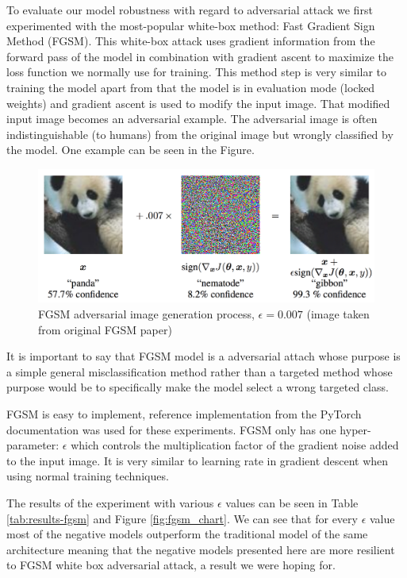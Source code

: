 \documentclass[b5paper]{book}
\let\cite\parencite
\begin{document}
To evaluate our model robustness with regard to adversarial attack we first experimented with the most-popular white-box method: Fast Gradient Sign Method (FGSM). \cite{goodfellowexplaining} This white-box attack uses gradient information from the forward pass of the model in combination with gradient ascent to maximize the loss function we normally use for training. This method step is very similar to training the model apart from that the model is in evaluation mode (locked weights) and gradient ascent is used to modify the input image. That modified input image becomes an adversarial example. The adversarial image is often indistinguishable (to humans) from the original image but wrongly classified by the model. One example can be seen in the Figure. 

\begin{figure}
\centering
  \includegraphics[width=1\textwidth]{figures/fgsm_panda_image.png}
\caption{FGSM adversarial image generation process, \( \epsilon = 0.007 \) (image taken from original FGSM paper)}
\label{fig:fgsmpanda}       %
\end{figure}

It is important to say that FGSM model is a adversarial attach whose purpose is a simple general misclassification method rather than a targeted method whose purpose would be to specifically make the model select a wrong targeted class.

FGSM is easy to implement, reference implementation from the PyTorch documentation was used for these experiments. FGSM only has one hyper-parameter: \( \epsilon \) which controls the multiplication factor of the gradient noise added to the input image. It is very similar to learning rate in gradient descent when using normal training techniques.

The results of the experiment with various \( \epsilon \) values can be seen in Table \ref{tab:results-fgsm} and Figure \ref{fig:fgsm_chart}. We can see that for every \( \epsilon \) value most of the negative models outperform the traditional model of the same architecture meaning that the negative models presented here are more resilient to FGSM white box adversarial attack, a result we were hoping for.
\end{document}
